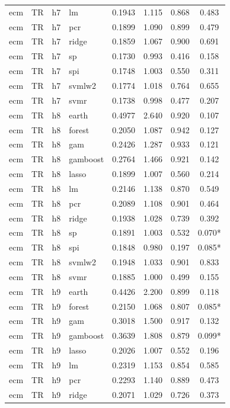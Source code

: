 \begin{ThreePartTable}
\begin{longtable}[t]{llclcccc}
ecm & TR & h7 & lm & 0.1943 & 1.115 & 0.868 & 0.483\\
ecm & TR & h7 & pcr & 0.1899 & 1.090 & 0.899 & 0.479\\
ecm & TR & h7 & ridge & 0.1859 & 1.067 & 0.900 & 0.691\\
ecm & TR & h7 & sp & 0.1730 & 0.993 & 0.416 & 0.158\\
ecm & TR & h7 & spi & 0.1748 & 1.003 & 0.550 & 0.311\\
ecm & TR & h7 & svmlw2 & 0.1774 & 1.018 & 0.764 & 0.655\\
ecm & TR & h7 & svmr & 0.1738 & 0.998 & 0.477 & 0.207\\
\addlinespace
ecm & TR & h8 & earth & 0.4977 & 2.640 & 0.920 & 0.107\\
ecm & TR & h8 & forest & 0.2050 & 1.087 & 0.942 & 0.127\\
ecm & TR & h8 & gam & 0.2426 & 1.287 & 0.933 & 0.121\\
ecm & TR & h8 & gamboost & 0.2764 & 1.466 & 0.921 & 0.142\\
ecm & TR & h8 & lasso & 0.1899 & 1.007 & 0.560 & 0.214\\
ecm & TR & h8 & lm & 0.2146 & 1.138 & 0.870 & 0.549\\
ecm & TR & h8 & pcr & 0.2089 & 1.108 & 0.901 & 0.464\\
ecm & TR & h8 & ridge & 0.1938 & 1.028 & 0.739 & 0.392\\
ecm & TR & h8 & sp & 0.1891 & 1.003 & 0.532 & 0.070*\\
ecm & TR & h8 & spi & 0.1848 & 0.980 & 0.197 & 0.085*\\
ecm & TR & h8 & svmlw2 & 0.1948 & 1.033 & 0.901 & 0.833\\
ecm & TR & h8 & svmr & 0.1885 & 1.000 & 0.499 & 0.155\\
\addlinespace
ecm & TR & h9 & earth & 0.4426 & 2.200 & 0.899 & 0.118\\
ecm & TR & h9 & forest & 0.2150 & 1.068 & 0.807 & 0.085*\\
ecm & TR & h9 & gam & 0.3018 & 1.500 & 0.917 & 0.132\\
ecm & TR & h9 & gamboost & 0.3639 & 1.808 & 0.879 & 0.099*\\
ecm & TR & h9 & lasso & 0.2026 & 1.007 & 0.552 & 0.196\\
ecm & TR & h9 & lm & 0.2319 & 1.153 & 0.854 & 0.585\\
ecm & TR & h9 & pcr & 0.2293 & 1.140 & 0.889 & 0.473\\
ecm & TR & h9 & ridge & 0.2071 & 1.029 & 0.726 & 0.373\\

\end{longtable}
\end{ThreePartTable}

